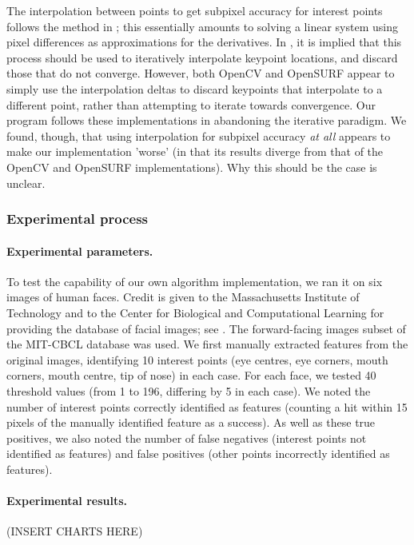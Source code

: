 The interpolation between points to get subpixel accuracy for interest points follows the method in \cite{inv-features}; this essentially amounts to solving a linear system using pixel differences as approximations for the derivatives. In \cite{SURF}, it is implied that this process should be used to iteratively interpolate keypoint locations, and discard those that do not converge. However, both OpenCV and OpenSURF appear to simply use the interpolation deltas to discard keypoints that interpolate to a different point, rather than attempting to iterate towards convergence. Our program follows these implementations in abandoning the iterative paradigm. We found, though, that using interpolation for subpixel accuracy \emph{at all} appears to make our implementation 'worse' (in that its results diverge from that of the OpenCV and OpenSURF implementations). Why this should be the case is unclear.

\subsubsection{Experimental process}

\paragraph{Experimental parameters.}
To test the capability of our own algorithm implementation, we ran it on six images of human faces. Credit is given to the Massachusetts Institute of Technology and to the Center for Biological and Computational Learning for providing the database of facial images; see \cite{database}. The forward-facing images subset of the MIT-CBCL database was used. We first manually extracted features from the original images, identifying 10 interest points (eye centres, eye corners, mouth corners, mouth centre, tip of nose) in each case. 
For each face, we tested 40 threshold values (from 1 to 196, differing by 5 in each case). We noted the number of interest points correctly identified as features (counting a hit within 15 pixels of the manually identified feature as a success). As well as these true positives, we also noted the number of false negatives (interest points not identified as features) and false positives (other points incorrectly identified as features).

\paragraph{Experimental results.}
(INSERT CHARTS HERE)


